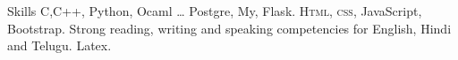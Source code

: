 
\begin{rubric}{Skills}
	C,C++, Python, Ocaml \ldots
\entry*[Databases]
	 Postgre, My, Flask.
	\textsc{Html, css}, JavaScript, Bootstrap.
\entry*[Languages]
	Strong reading, writing and speaking competencies for English, Hindi and Telugu.
\entry*[Misc.]
	Latex.
\end{rubric}
